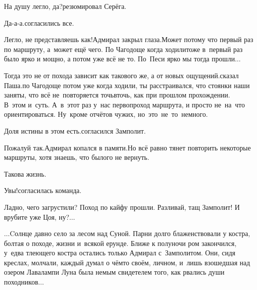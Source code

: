 \diagdash На душу легло, да?\mdash резюмировал Серёга.

\diagdash Да-а-а.\mdash согласились все.

\diagdash Легло, не представляешь как!\mdash Адмирал закрыл глаза.\mdash Может потому что первый раз по маршруту, а~может ещё чего. По Чагодоще когда ходили\mdash тоже в~первый раз было ярко и мощно, а потом уже всё не то. По~Песи ярко мы тогда прошли$\ldots$

\diagdash Тогда это не от похода зависит как такового же, а от новых ощущений.\mdash сказал Паша.\mdash по Чагодоще потом уже когда ходили, ты расстраивался, что стоянки наши заняты, что всё не~повторяется точь\sdash в\sdash точь, как при прошлом прохождении. В~этом и~суть. А~в~этот раз у~нас первопроход маршрута, и просто не~на~что ориентироваться. Ну~кроме отчётов чужих, но~это~не~то~немного.

\diagdash Доля истины в этом есть.\mdash согласился Замполит.

\diagdash Пожалуй так.\mdash Адмирал копался в памяти.\mdash Но всё равно тянет повторить некоторые маршруты, хотя знаешь, что былого не вернуть.

\diagdash Такова жизнь.

\diagdash Увы!\mdash согласилась команда.

\diagdash Ладно, чего загрустили? Поход по кайфу прошли. Разливай, тащ Замполит! И врубите уже Цоя, ну?$\ldots$

\vspace{1em}
$\ldots$Cолнце давно село за лесом над Суной. Парни долго блаженствовали у костра, болтая о походе, жизни и~всякой ерунде. Ближе к полуночи ром закончился, у~едва тлеющего костра остались только Адмирал с~Замполитом. Они, сидя креслах, молчали, каждый думал о чём\sdash то своём, личном, и~лишь взошедшая над озером Лавалампи Луна была немым свидетелем того, как рвались души походников$\ldots$


\begin{center}
\end{center}
